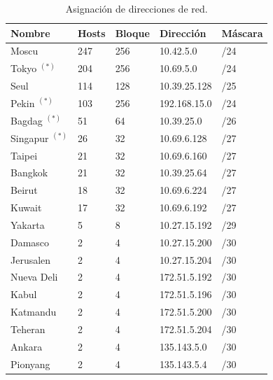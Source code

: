 \documentclass[12pt,titlepage]{article}
\begin{document}
\begin{table}
  \begin{center}
    \begin{tabular}{|l|l|l|l|l|}
      \hline
        \bf{Nombre} & \bf{Hosts} & \bf{Bloque} & \bf{Dirección} & \bf{Máscara} \\
      \hline 
	Moscu		& 247 & 256 & 10.42.5.0     & /24 \\
        Tokyo $^{(*)}$      & 204 & 256 & 10.69.5.0     & /24 \\
        Seul               & 114 & 128 & 10.39.25.128  & /25 \\
        Pekin $^{(*)}$     & 103 & 256 & 192.168.15.0  & /24 \\
        Bagdag $^{(*)}$  & 51  & 64  & 10.39.25.0    & /26 \\
        Singapur $^{(*)}$      & 26  & 32  & 10.69.6.128   & /27 \\
        Taipei              & 21  & 32  & 10.69.6.160   & /27 \\
	Bangkok                & 21  & 32  & 10.39.25.64  & /27 \\       
	Beirut                 & 18  & 32  & 10.69.6.224   & /27 \\
	Kuwait                 & 17  & 32  & 10.69.6.192   & /27 \\
        Yakarta                  & 5   & 8   & 10.27.15.192  & /29 \\
        Damasco             & 2   & 4   & 10.27.15.200  & /30 \\
        Jerusalen                 & 2   & 4   & 10.27.15.204  & /30 \\
        Nueva Deli                 & 2   & 4   & 172.51.5.192  & /30 \\
        Kabul                  & 2   & 4   & 172.51.5.196  & /30 \\
        Katmandu               & 2   & 4   & 172.51.5.200  & /30 \\
        Teheran                 & 2   & 4   & 172.51.5.204  & /30 \\
        Ankara                & 2   & 4   & 135.143.5.0   & /30 \\
        Pionyang               & 2   & 4   & 135.143.5.4   & /30 \\ 
    \hline
    \end{tabular} \\
  \end{center}
  \caption{Asignación de direcciones de red.}
\end{table}
\FloatBarrier
\end{document}
